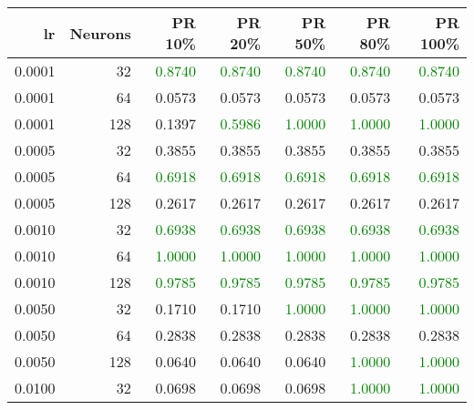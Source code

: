 \begin{tabular}{rrrrrrr}
\toprule
lr & Neurons & PR 10\% & PR 20\% & PR 50\% & PR 80\% & PR 100\% \\
\midrule
0.0001 & 32 & \textcolor{green} {0.8740} & \textcolor{green} {0.8740} & \textcolor{green} {0.8740} & \textcolor{green} {0.8740} & \textcolor{green} {0.8740} \\
0.0001 & 64 & \textcolor{blu} {0.0573} & \textcolor{blu} {0.0573} & \textcolor{blu} {0.0573} & \textcolor{blu} {0.0573} & \textcolor{blu} {0.0573} \\
0.0001 & 128 & \textcolor{blu} {0.1397} & \textcolor{green} {0.5986} & \textcolor{green} {1.0000} & \textcolor{green} {1.0000} & \textcolor{green} {1.0000} \\
0.0005 & 32 & \textcolor{blu} {0.3855} & \textcolor{blu} {0.3855} & \textcolor{blu} {0.3855} & \textcolor{blu} {0.3855} & \textcolor{blu} {0.3855} \\
0.0005 & 64 & \textcolor{green} {0.6918} & \textcolor{green} {0.6918} & \textcolor{green} {0.6918} & \textcolor{green} {0.6918} & \textcolor{green} {0.6918} \\
0.0005 & 128 & \textcolor{blu} {0.2617} & \textcolor{blu} {0.2617} & \textcolor{blu} {0.2617} & \textcolor{blu} {0.2617} & \textcolor{blu} {0.2617} \\
0.0010 & 32 & \textcolor{green} {0.6938} & \textcolor{green} {0.6938} & \textcolor{green} {0.6938} & \textcolor{green} {0.6938} & \textcolor{green} {0.6938} \\
0.0010 & 64 & \textcolor{green} {1.0000} & \textcolor{green} {1.0000} & \textcolor{green} {1.0000} & \textcolor{green} {1.0000} & \textcolor{green} {1.0000} \\
0.0010 & 128 & \textcolor{green} {0.9785} & \textcolor{green} {0.9785} & \textcolor{green} {0.9785} & \textcolor{green} {0.9785} & \textcolor{green} {0.9785} \\
0.0050 & 32 & \textcolor{blu} {0.1710} & \textcolor{blu} {0.1710} & \textcolor{green} {1.0000} & \textcolor{green} {1.0000} & \textcolor{green} {1.0000} \\
0.0050 & 64 & \textcolor{blu} {0.2838} & \textcolor{blu} {0.2838} & \textcolor{blu} {0.2838} & \textcolor{blu} {0.2838} & \textcolor{blu} {0.2838} \\
0.0050 & 128 & \textcolor{blu} {0.0640} & \textcolor{blu} {0.0640} & \textcolor{blu} {0.0640} & \textcolor{green} {1.0000} & \textcolor{green} {1.0000} \\
0.0100 & 32 & \textcolor{blu} {0.0698} & \textcolor{blu} {0.0698} & \textcolor{blu} {0.0698} & \textcolor{green} {1.0000} & \textcolor{green} {1.0000} \\

\end{tabular}
